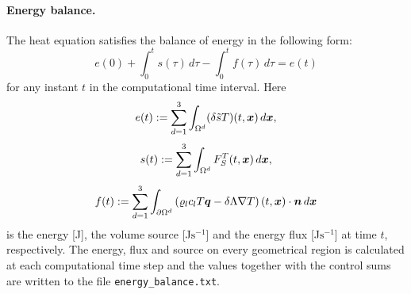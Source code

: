 \paragraph{Energy balance.}
The heat equation satisfies the balance of energy in the following form:
$$ e(0) + \int_0^t s(\tau) \,d\tau - \int_0^t f(\tau) \,d\tau = e(t) $$
for any instant $t$ in the computational time interval.
Here
$$ e(t) := \sum_{d=1}^3\int_{\Omega^d}(\delta \tilde s T)(t,\mathbf{\boldsymbol{x}})\,d\mathbf{\boldsymbol{x}}, $$
$$ s(t) := \sum_{d=1}^3\int_{\Omega^d}F_S^T(t,\mathbf{\boldsymbol{x}})\,d\mathbf{\boldsymbol{x}}, $$
$$ f(t) := \sum_{d=1}^3\int_{\partial\Omega^d}\left(\varrho_l c_l T\mathbf{\boldsymbol{q}} - \delta\Lambda\nabla T\right)(t,\mathbf{\boldsymbol{x}})\cdot\mathbf{\boldsymbol{n}} \,d\mathbf{\boldsymbol{x}} $$
is the energy [J], the volume source [J$\mathrm{s}^{-1}$] and the energy flux [J$\mathrm{s}^{-1}$] at time $t$, respectively.
The energy, flux and source on every geometrical region is calculated at each computational time step and the values together with the control sums are written to the file \texttt{energy\_balance.txt}.





